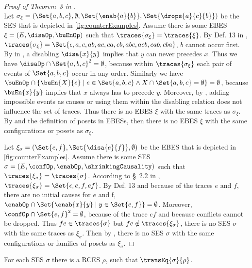 \documentclass[runningheads,a4paper]{llncs}
\begin{document}
\begin{proof}[Proof of Theorem~3 in \cite{dynamicCausality15}]
	$ $\\
	Let $ \sigma_{\xi} = \left( \Set{ a, b, c }, \emptyset, \Set{ \enab{a}{b} }, \Set{ \drops{a}{c}{b} } \right) $ be the SES that is depicted in \fig\ref{fig:counterExamples}.
	Assume there is some EBES $ \xi = \left( E, \disaOp, \buEnOp \right) $ such that $ \traces{\sigma_\xi} = \traces{\xi} $.
	By Def. 13 in \cite{dynamicCausality15}, $ \traces{\sigma_\xi} = \Set{ \epsilon, a, c, ab, ac, ca, cb, abc, acb, cab, cba } $, \ie $ b $ cannot occur first.
	By  in \cite{dynamicCausality15}, a disabling $ \disa{x}{y} $ implies that $ y $ can never precedes $ x $.
	Thus we have $ \disaOp \cap \Set{ a, b, c }^2 = \emptyset $, because within $ \traces{\sigma_\xi} $ each pair of events of $ \Set{ a, b, c } $ occur in any order.
	Similarly we have $ \buEnOp \cap \{ \buEn{X}{e} \mid e \in \Set{ a, b, c } \land X \cap \Set{ a, b, c } = \emptyset \} = \emptyset $, because $ \buEn{x}{y} $ implies that $ x $ always has to precede $ y $.
	Moreover, by , adding impossible events as causes
	or using them within the disabling relation does not influence the set of
	traces.
	Thus there is no EBES $ \xi $ with the same traces as $ \sigma_{\xi} $. By
	 and the definition of posets in EBESs, then there is no EBES $ \xi $ with the same configurations or posets as $ \sigma_{\xi} $.
	
	Let $ \xi_{\sigma} = \left( \Set{ e, f }, \Set{ \disa{e}{f} }, \emptyset \right) $ be the EBES that is depicted in \fig\ref{fig:counterExamples}.
	Assume there is some SES $ \sigma = \left( E, \confOp, \enabOp, \shrinkingCausality \right) $ such that $ \traces{\xi_{\sigma}} = \traces{\sigma} $.
	According to \S~2.2 in \cite{dynamicCausality15}, $ \traces{\xi_{\sigma}} = \Set{ \epsilon,
	e, f, ef } $.
	By Def. 13 and because of the traces $ e $ and $ f $, there are no initial causes for $ e $ and f, \ie $ \enabOp \cap \Set{ \enab{x}{y} \mid y \in \Set{ e, f } } = \emptyset $.
	Moreover, $ \confOp \cap \Set{ e, f }^2 = \emptyset $, because of the trace $ ef $ and because conflicts cannot be dropped.
	Thus $ fe \in \traces{\sigma} $ but $ fe \notin \traces{\xi_{\sigma}} $, \ie
	there is no SES $ \sigma $ with the same traces as $ \xi_{\sigma} $. Then by
	, there is no SES $ \sigma $ with the same configurations or families of posets as $ \xi_{\sigma} $.
\end{proof}


\begin{lemma}\label{lma:SESinRCES}
	For each SES $ \sigma $ there is a RCES $ \rho $, such that $  \transEq{\sigma}{\rho}$.
\end{lemma}
\end{document}

